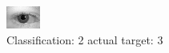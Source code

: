 \begin{figure}[h!]
\begin{center}
\includegraphics[width=0.60\columnwidth]{figures/ID549_class_2_target_3.png}
\end{center}
\caption{ Classification: 2 actual target: 3}
\label{fig:ID549_class_2_target_3}
\end{figure}
